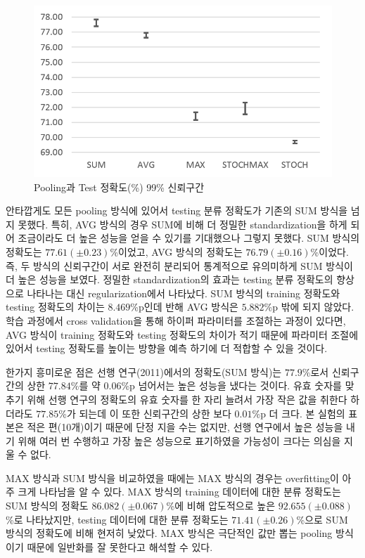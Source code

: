 \documentclass[a4paper,9pt]{article}
\begin{document}
\begin{multicols*}{2}
\begin{figure}[H]
\includegraphics[width=\linewidth]{error_bar}
\caption{Pooling과 Test 정확도(\%) 99\% 신뢰구간}
\label{fig:error_bar}
\end{figure}

안타깝게도 모든 pooling 방식에 있어서 testing 분류 정확도가 기존의 SUM 방식을 넘지 못했다.
특히, AVG 방식의 경우 SUM에 비해 더 정밀한 standardization을 하게 되어 조금이라도 더 높은 성능을 얻을 수 있기를 기대했으나 그렇지 못했다.
SUM 방식의 정확도는 $77.61(\pm 0.23)$\%이었고, AVG 방식의 정확도는 $76.79(\pm 0.16)$\%이었다.
즉, 두 방식의 신뢰구간이 서로 완전히 분리되어 통계적으로 유의미하게 SUM 방식이 더 높은 성능을 보였다.
정밀한 standardization의 효과는 testing 분류 정확도의 향상으로 나타나는 대신 regularization에서 나타났다.
SUM 방식의 training 정확도와 testing 정확도의 차이는 $8.469$\%p인데 반해 AVG 방식은 $5.882$\%p 밖에 되지 않았다.
학습 과정에서 cross validation을 통해 하이퍼 파라미터를 조절하는 과정이 있다면, AVG 방식이 training 정확도와 testing 정확도의 차이가 적기 때문에 파라미터 조절에 있어서 testing 정확도를 높이는 방향을 예측 하기에 더 적합할 수 있을 것이다.

한가지 흥미로운 점은 선행 연구(2011)에서의 정확도(SUM 방식)는 $77.9$\%로서 신뢰구간의 상한 $77.84$\%를 약 $0.06$\%p 넘어서는 높은 성능을 냈다는 것이다.
유효 숫자를 맞추기 위해 선행 연구의 정확도의 유효 숫자를 한 자리 늘려서 가장 작은 값을 취한다 하더라도 $77.85$\%가 되는데 이 또한 신뢰구간의 상한 보다 $0.01$\%p 더 크다.
본 실험의 표본은 적은 편(10개)이기 때문에 단정 지을 수는 없지만, 선행 연구에서 높은 성능을 내기 위해 여러 번 수행하고 가장 높은 성능으로 표기하였을 가능성이 크다는 의심을 지울 수 없다.

MAX 방식과 SUM 방식을 비교하였을 때에는 MAX 방식의 경우는 overfitting이 아주 크게 나타남을 알 수 있다.
MAX 방식의 training 데이터에 대한 분류 정확도는 SUM 방식의 정확도 $86.082(\pm 0.067)$\%에 비해 압도적으로 높은 $92.655(\pm 0.088)$\%로 나타났지만, testing 데이터에 대한 분류 정확도는 $71.41(\pm 0.26)$\%으로 SUM 방식의 정확도에 비해 현저히 낮았다.
MAX 방식은 극단적인 값만 뽑는 pooling 방식이기 때문에 일반화를 잘 못한다고 해석할 수 있다.


\end{multicols*}
\end{document}
